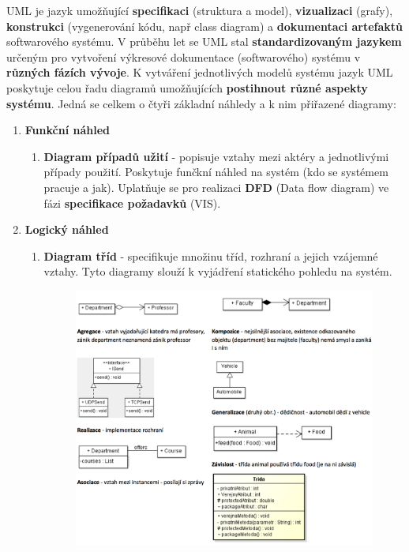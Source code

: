 UML je jazyk umožňující \textbf{specifikaci} (struktura a model), \textbf{vizualizaci} (grafy), \textbf{konstrukci} (vygenerování kódu, např class diagram) a \textbf{dokumentaci artefaktů} softwarového systému. V průběhu let se UML stal \textbf{standardizovaným jazykem }určeným pro vytvoření výkresové dokumentace (softwarového) systému v \textbf{různých fázích vývoje}. K vytváření jednotlivých modelů systému jazyk UML poskytuje celou řadu diagramů umožňujících \textbf{postihnout různé aspekty systému}. Jedná se celkem o čtyři základní náhledy a k nim přiřazené diagramy: 

\begin{enumerate}
\item \textbf{Funkční náhled}
\begin{enumerate}
\item \textbf{Diagram případů užití} - popisuje vztahy mezi aktéry a jednotlivými případy použití. Poskytuje funčkní náhled na systém (kdo se systémem pracuje a jak). Uplatňuje se pro realizaci \textbf{DFD} (Data flow diagram) ve fázi \textbf{specifikace požadavků} (VIS).
\end{enumerate}
\item \textbf{Logický náhled}
\begin{enumerate}
\item \textbf{Diagram tříd} - specifikuje množinu tříd, rozhraní a jejich vzájemné vztahy. Tyto diagramy slouží k vyjádření statického pohledu na systém.
\begin{figure}[H]
	\centering
	\includegraphics[width=.9\textwidth]{assets/class.png}
\end{figure}

\end{enumerate}
\end{enumerate}
